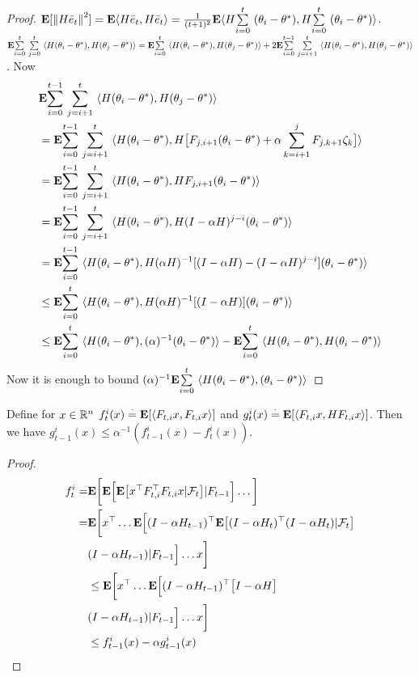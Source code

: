 \begin{proof}
$\E[\norm{H\eb_t}^2]=\E\ip{H\eb_t,H\eb_t}=\frac{1}{(t+1)^2}\E\ip{H\ous{\sum}{i=0}{t}(\theta_i-\ts),H\ous{\sum}{i=0}{t}(\theta_i-\ts)}$.
$\E\ous{\sum}{i=0}{t}\ous{\sum}{j=0}{t}\ip{H(\theta_i-\theta^*),H(\theta_j-\theta^*)}=\E\ous{\sum}{i=0}{t}\ip{H(\theta_i-\theta^*),H(\theta_j-\theta^*)}+ 2\E\ous{\sum}{i=0}{t-1}\ous{\sum}{j=i+1}{t}\ip{H(\theta_i-\theta^*),H(\theta_j-\theta^*)}$. Now
\begin{align}\label{inter}
&\E\ous{\sum}{i=0}{t-1}\ous{\sum}{j=i+1}{t}\ip{H(\theta_i-\theta^*),H(\theta_j-\theta^*)}\nn\\
&=\E\ous{\sum}{i=0}{t-1}\ous{\sum}{j=i+1}{t}\ip{H(\theta_i-\theta^*),H\big[F_{j,i+1} (\theta_i-\theta^*)+\alpha\sum_{k=i+1}^j F_{j,k+1}\zeta_{k}\big]}\nn\\
&=\E\ous{\sum}{i=0}{t-1}\ous{\sum}{j=i+1}{t}\ip{H(\theta_i-\theta^*),H F_{j,i+1} (\theta_i-\theta^*)}\nn\\
&=\E\ous{\sum}{i=0}{t-1}\ous{\sum}{j=i+1}{t}\ip{H(\theta_i-\theta^*),H(I-\alpha H)^{j-i} (\theta_i-\theta^*)}\nn\\
&=\E\ous{\sum}{i=0}{t-1}\ip{H(\theta_i-\theta^*),H(\alpha H)^{-1}[(I-\alpha H)-(I-\alpha H)^{j-i}] (\theta_i-\theta^*)}\nn\\
&\leq \E\ous{\sum}{i=0}{t}\ip{H(\theta_i-\theta^*),H(\alpha H)^{-1}[(I-\alpha H)] (\theta_i-\theta^*)}\nn\\
&\leq \E\ous{\sum}{i=0}{t}\ip{H(\theta_i-\theta^*),(\alpha)^{-1} (\theta_i-\theta^*)}- \E\ous{\sum}{i=0}{t}\ip{H(\theta_i-\theta^*),H(\theta_i-\theta^*)}\nn\\
\end{align}
Now it is enough to bound $(\alpha)^{-1} \E\ous{\sum}{i=0}{t}\ip{H(\theta_i-\theta^*),(\theta_i-\theta^*)}$
\end{proof}

\begin{lemma}
Define for $x\in \R^n$ $f^i_t(x)\eqdef\E[\ip{F_{t,i}x,F_{t,i}x}]$ and $g^i_t(x)\eqdef\E[\ip{F_{t,i}x, H F_{t,i}x}]$. Then we have $g^i_{t-1}(x)\leq \alpha^{-1}(f^i_{t-1}(x)-f^i_t(x))$.
\end{lemma}
\begin{proof}
\begin{align*}
f^i_t=&\E\bigg[\E\Big[\E\big[ x^\top F^\top_{t,i} F_{t,i}x|\F_{t}\big]|F_{t-1}\Big]\ldots\bigg]\\
=&\E\bigg[x^\top\ldots\E\Big[(I-\alpha H_{t-1})^\top\E\big[ (I-\alpha H_t)^\top(I-\alpha H_t)|\F_{t}\big]\\&(I-\alpha H_{t-1})|F_{t-1}\Big]\ldots x\bigg]\\
&\leq \E\bigg[x^\top\ldots\E\Big[(I-\alpha H_{t-1})^\top\big[I-\alpha H\big]\\&(I-\alpha H_{t-1})|F_{t-1}\Big]\ldots x\bigg]\\
&\leq f^i_{t-1}(x)-\alpha g^i_{t-1}(x)
\end{align*}
\end{proof}



